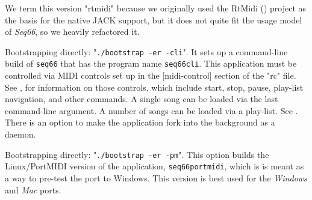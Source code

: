         We term this version "rtmidi" because we originally
        used the RtMidi (\cite{rtmidi}) project as the basis for the native
        JACK support, but it does not quite fit the usage model
        of \textsl{Seq66}, so we heavily refactored it.

        Bootstrapping directly:
        "\texttt{./bootstrap -er -cli}".
        It sets up a command-line build of \texttt{seq66} that has the
        program name \texttt{seq66cli}.
        This application must be controlled via MIDI controls set up in the
        [midi-control] section of the "rc" file.
        See , for
        information on those controls, which include start, stop,
        pause, play-list navigation, and other commands.
        A single song can be loaded via the last command-line argument.
        A number of songs can be loaded via a play-list.
        See .
        There is an option to make
        the application fork into the background as a daemon.
%

        Bootstrapping directly:
        "\texttt{./bootstrap -er -pm}".
        This option builds the Linux/PortMIDI version of the application,
        \texttt{seq66portmidi},
        which is is meant as a way to pre-test the
        port to Windows.
        This version is best used for the \textsl{Windows} and
        \textsl{Mac} ports.

%

